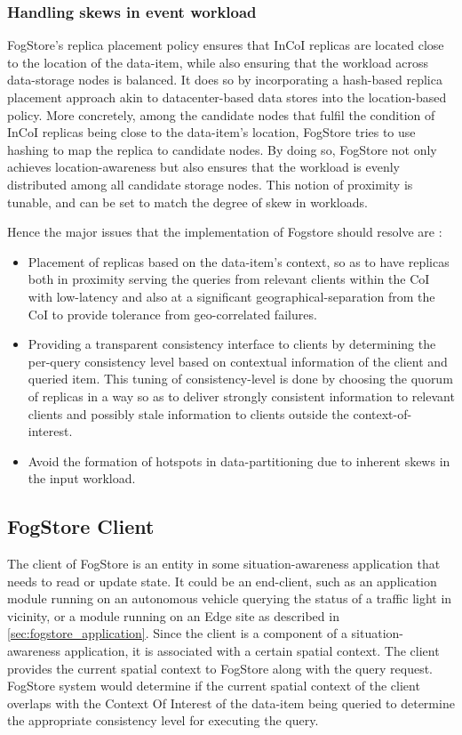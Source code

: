 \subsubsection{Handling skews in event workload}
FogStore's replica placement policy ensures that InCoI replicas are located close to the location of the data-item, while also ensuring that the workload across data-storage nodes is balanced. It does so by incorporating a hash-based replica placement approach akin to datacenter-based data stores into the location-based policy. More concretely, among the candidate nodes that fulfil the condition of InCoI replicas being close to the data-item's location, FogStore tries to use hashing to map the replica to candidate nodes. By doing so, FogStore not only achieves location-awareness but also ensures that the workload is evenly distributed among all candidate storage nodes. This notion of proximity is tunable, and can be set to match the degree of skew in workloads.

\par Hence the major issues that the implementation of Fogstore should resolve are :
\begin{itemize}
\item Placement of replicas based on the data-item's context, so as to have replicas both in proximity serving the queries from relevant clients within the CoI with low-latency and also at a significant geographical-separation from the CoI to provide tolerance from geo-correlated failures.
\item Providing a transparent consistency interface to clients by determining the per-query consistency level based on contextual information of the client and queried item. This tuning of consistency-level is done by choosing the quorum of replicas in a way so as to deliver strongly consistent information to relevant clients and possibly stale information to clients outside the context-of-interest.
\item Avoid the formation of hotspots in data-partitioning due to inherent skews in the input workload.
\end{itemize}

\subsection{FogStore Client}
The client of FogStore is an entity in some situation-awareness application that needs to read or update state. It could be an end-client, such as an application module running on an autonomous vehicle querying the status of a traffic light in vicinity, or a module running on an Edge site as described in \cref{sec:fogstore_application}. Since the client is a component of a situation-awareness application, it is associated with a certain spatial context. The client provides the current spatial context to FogStore along with the query request. FogStore system would determine if the current spatial context of the client overlaps with  the Context Of Interest of the data-item being queried to determine the appropriate consistency level for executing the query.

